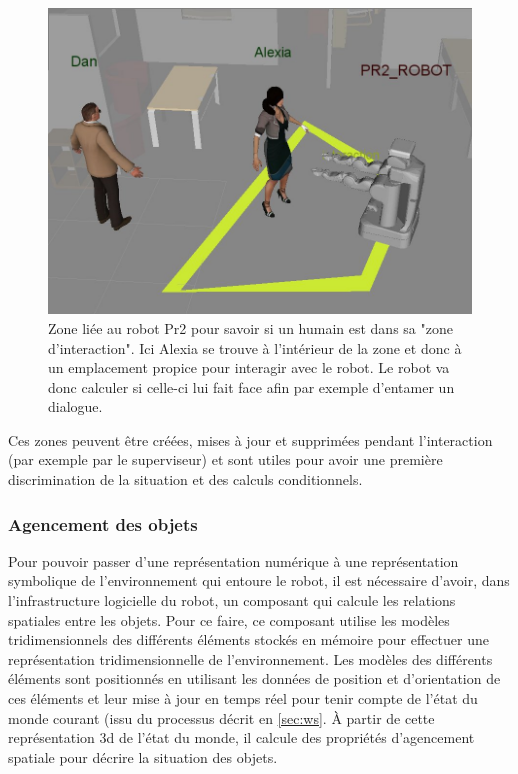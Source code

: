 \documentclass[a4paper,11pt,twoside]{StyleThese}
\begin{document}
\begin{figure}[ht!]
 \centering
  \includegraphics[width=0.69\linewidth]{./img/interactionarea.jpg} 
    \caption {Zone liée au robot Pr2 pour savoir si un humain est dans sa "zone d'interaction". Ici Alexia se trouve à l'intérieur de la zone et donc à un emplacement propice pour interagir avec le robot. Le robot va donc calculer si celle-ci lui fait face afin par exemple d'entamer un dialogue.}
  \label{fig:interaction}
\end{figure}

Ces zones peuvent être créées, mises à jour et supprimées pendant l'interaction (par exemple par le superviseur) et sont utiles pour avoir une première discrimination de la situation et des calculs conditionnels.


\subsubsection{Agencement des objets}
\label{sec:agencement}
Pour pouvoir passer d'une représentation numérique à une représentation symbolique de l'environnement qui entoure le robot, il est nécessaire d'avoir, dans l'infrastructure logicielle du robot, un composant qui calcule les relations spatiales entre les objets. Pour ce faire, ce composant utilise les modèles tridimensionnels des différents éléments stockés en mémoire pour effectuer une représentation tridimensionnelle de l'environnement. Les modèles des différents éléments sont positionnés en utilisant les données de position et d'orientation de ces éléments et leur mise à jour en temps réel pour tenir compte de l'état du monde courant (issu du processus décrit en \ref{sec:ws}. À partir de cette représentation 3d de l'état du monde, il calcule des propriétés d'agencement spatiale pour décrire la situation des objets.
\end{document}
